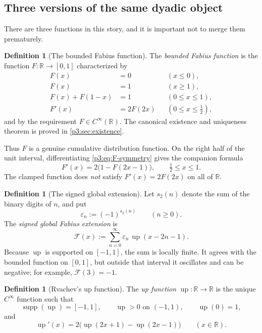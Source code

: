 \documentclass[11pt]{article}
\numberwithin{equation}{section}
\theoremstyle{definition}
\newtheorem{definition}[theorem]{Definition}
\theoremstyle{remark}
\DeclareMathOperator{\supp}{supp}
\newcommand{\R}{\mathbb R}
\newcommand{\GF}{\mathcal F}
\newcommand{\upf}{\operatorname{up}}
\newcommand{\eps}{\varepsilon}
\begin{document}
\subsection{Three versions of the same dyadic object}

There are three functions in this story, and it is important not to merge them prematurely.

\begin{definition}[The bounded Fabius function]
The \emph{bounded Fabius function} is the function $F:\R\to[0,1]$ characterized by
\begin{align}
 F(x)&=0 &&(x\le 0),\label{p3:eq:F-left-clamp}\\
 F(x)&=1 &&(x\ge 1),\label{p3:eq:F-right-clamp}\\
 F(x)+F(1-x)&=1 &&(0\le x\le1),\label{p3:eq:F-symmetry}\\
 F'(x)&=2F(2x) &&(0\le x\le\tfrac12),\label{p3:eq:F-diff}
\end{align}
and by the requirement $F\in C^\infty(\R)$.  The canonical existence and uniqueness theorem is proved in \cref{p3:sec:existence}.
\end{definition}

Thus $F$ is a genuine cumulative distribution function.  On the right half of the unit interval, differentiating \eqref{p3:eq:F-symmetry} gives the companion formula
\begin{equation}\label{p3:eq:F-right-derivative}
 F'(x)=2\bigl(1-F(2x-1)\bigr),\qquad \tfrac12\le x\le1.
\end{equation}
The clamped function does \emph{not} satisfy $F'(x)=2F(2x)$ on all of $\R$.

\begin{definition}[The signed global extension]
Let $s_2(n)$ denote the sum of the binary digits of $n$, and put
\begin{equation}\label{p3:eq:thue-morse-sign}
 \eps_n:=(-1)^{s_2(n)}\qquad(n\ge0).
\end{equation}
The \emph{signed global Fabius extension} is
\begin{equation}\label{p3:eq:global-F-def}
 \GF(x):=\sum_{n=0}^{\infty}\eps_n\,\upf(x-2n-1).
\end{equation}
Because $\upf$ is supported on $[-1,1]$, the sum is locally finite.  It agrees with the bounded function on $[0,1]$, but outside that interval it oscillates and can be negative; for example, $\GF(3)=-1$.
\end{definition}

\begin{definition}[Rvachev's up function]
The \emph{up function} $\upf:\R\to\R$ is the unique $C^\infty$ function such that
\begin{equation}\label{p3:eq:up-basic}
 \supp(\upf)=[-1,1],\qquad \upf>0\text{ on }(-1,1),\qquad \upf(0)=1,
\end{equation}
and
\begin{equation}\label{p3:eq:up-differential}
 \upf'(x)=2\bigl(\upf(2x+1)-\upf(2x-1)\bigr)
 \qquad(x\in\R).
\end{equation}
\end{definition}
\end{document}
